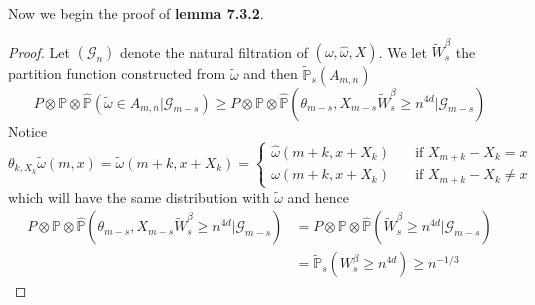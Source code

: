 Now we begin the proof of \textbf{lemma 7.3.2}.\par
\begin{proof}
    Let $(\mathcal{G}_n)$ denote the natural filtration of $(\omega,\hat{\omega},X)$. We let $\tilde{W}_s^{\beta}$ the partition function constructed from $\tilde{\omega}$ and then $\widetilde{\mathbb{P}}_s(A_{m,n})$
    \[
    P\otimes\mathbb{P}\otimes\widehat{\mathbb{P}}(\tilde{\omega}\in A_{m,n}|\mathcal{G}_{m-s}) \geq P\otimes\mathbb{P}\otimes\widehat{\mathbb{P}}(\theta_{m-s},X_{m-s}\widetilde{W}_s^{\beta}\geq n^{4d}|\mathcal{G}_{m-s})
    \]
    Notice \[\theta_{k,X_k}\tilde{\omega}(m,x) = \tilde{\omega}(m+k,x+X_k) = \begin{cases}
        \hat{\omega}(m+k,x+X_k)\quad&\text{if }X_{m+k} - X_k= x\\
        \omega(m+k,x+X_k)&\text{if }X_{m+k} - X_k\neq x
    \end{cases}\]
    which will have the same distribution with $\tilde{\omega}$ and hence
    \[
    \begin{aligned}
        P\otimes\mathbb{P}\otimes\widehat{\mathbb{P}}(\theta_{m-s},X_{m-s}\widetilde{W}_s^{\beta}\geq n^{4d}|\mathcal{G}_{m-s}) &= P\otimes\mathbb{P}\otimes\widehat{\mathbb{P}}(\widetilde{W}_s^{\beta}\geq n^{4d}|\mathcal{G}_{m-s}) \\
        &=\widetilde{\mathbb{P}}_s(W_s^{\beta} \geq n^{4d}) \geq n^{-1/3}
    \end{aligned}
    \]
\end{proof}

